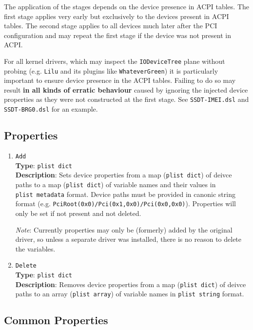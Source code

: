 \documentclass[]{article}
\makeatletter
\renewcommand{\label}[1]{%
\zref@wrapper@immediate{\oldlabel{#1}}}  %
\makeatother
\begin{document}
The application of the stages depends on the device presence in ACPI tables.
The first stage applies very early but exclusively to the devices present in ACPI tables.
The second stage applies to all devices much later after the PCI configuration
and may repeat the first stage if the device was not present in ACPI.

For all kernel drivers, which may inspect the \texttt{IODeviceTree} plane without
probing (e.g. \texttt{Lilu} and its plugins like \texttt{WhateverGreen}) it is particularly
important to ensure device presence in the ACPI tables. Failing to do so may result
\textbf{in all kinds of erratic behaviour} caused by ignoring the injected device properties
as they were not constructed at the first stage. See \texttt{SSDT-IMEI.dsl} and
\texttt{SSDT-BRG0.dsl} for an example.

\subsection{Properties}\label{devpropsprops}

\begin{enumerate}
\item
  \texttt{Add}\\
  \textbf{Type}: \texttt{plist\ dict}\\
  \textbf{Description}: Sets device properties from a map (\texttt{plist\ dict})
  of deivce paths to a map (\texttt{plist\ dict}) of variable names and their values
  in \texttt{plist\ metadata} format. Device paths must be provided in canonic string
  format (e.g. \texttt{PciRoot(0x0)/Pci(0x1,0x0)/Pci(0x0,0x0)}). Properties will only
  be set if not present and not deleted.

  \emph{Note}: Currently properties may only be (formerly) added by the original driver,
  so unless a separate driver was installed, there is no reason to delete the variables.

\item
  \texttt{Delete}\\
  \textbf{Type}: \texttt{plist\ dict}\\
  \textbf{Description}: Removes device properties from a map (\texttt{plist\ dict})
  of deivce paths to an array (\texttt{plist\ array}) of variable names in
  \texttt{plist\ string} format.

\end{enumerate}

\subsection{Common Properties}\label{devpropscommon}
\end{document}
